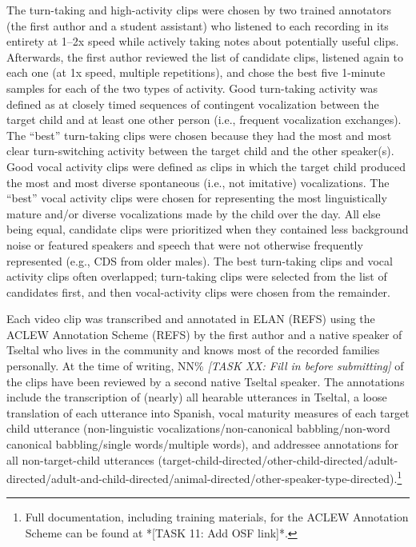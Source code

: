 \documentclass[floatsintext,man]{apa6}
\theoremstyle{definition}
\theoremstyle{definition}
\theoremstyle{definition}
\theoremstyle{remark}
\begin{document}
The turn-taking and high-activity clips were chosen by two trained
annotators (the first author and a student assistant) who listened to
each recording in its entirety at 1--2x speed while actively taking
notes about potentially useful clips. Afterwards, the first author
reviewed the list of candidate clips, listened again to each one (at 1x
speed, multiple repetitions), and chose the best five 1-minute samples
for each of the two types of activity. Good turn-taking activity was
defined as at closely timed sequences of contingent vocalization between
the target child and at least one other person (i.e., frequent
vocalization exchanges). The \enquote{best} turn-taking clips were
chosen because they had the most and most clear turn-switching activity
between the target child and the other speaker(s). Good vocal activity
clips were defined as clips in which the target child produced the most
and most diverse spontaneous (i.e., not imitative) vocalizations. The
\enquote{best} vocal activity clips were chosen for representing the
most linguistically mature and/or diverse vocalizations made by the
child over the day. All else being equal, candidate clips were
prioritized when they contained less background noise or featured
speakers and speech that were not otherwise frequently represented
(e.g., CDS from older males). The best turn-taking clips and vocal
activity clips often overlapped; turn-taking clips were selected from
the list of candidates first, and then vocal-activity clips were chosen
from the remainder.

Each video clip was transcribed and annotated in ELAN (REFS) using the
ACLEW Annotation Scheme (REFS) by the first author and a native speaker
of Tseltal who lives in the community and knows most of the recorded
families personally. At the time of writing, NN\% \emph{{[}TASK XX: Fill
in before submitting{]}} of the clips have been reviewed by a second
native Tseltal speaker. The annotations include the transcription of
(nearly) all hearable utterances in Tseltal, a loose translation of each
utterance into Spanish, vocal maturity measures of each target child
utterance (non-linguistic vocalizations/non-canonical babbling/non-word
canonical babbling/single words/multiple words), and addressee
annotations for all non-target-child utterances
(target-child-directed/other-child-directed/adult-directed/adult-and-child-directed/animal-directed/other-speaker-type-directed).\footnote{Full documentation, including training materials, for the ACLEW Annotation Scheme can be found at *[TASK 11: Add OSF link]*.}
\end{document}
